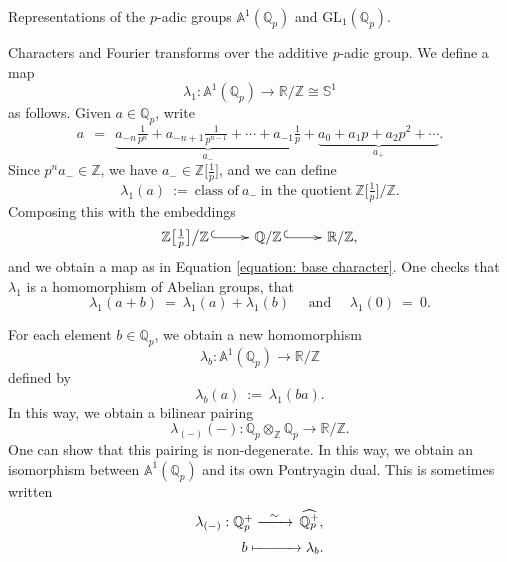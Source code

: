 \documentclass[letterpaper,11pt, reqno]{amsart}
\makeatletter
\newtheorem{monodromy theorem}{Monodromy Theorem}[subsection]
\newtheorem{wild conjecture}[theorem]{Wild Conjecture}
\newtheorem{research objectives}{Research objectives}[subsection]
\newtheorem{research question}[theorem]{Research questions}
\newtheorem{aside question}[theorem]{Aside question}
\newtheorem{audio example}[theorem]{\loudspeaker[3] Example}
\newtheorem{blank remark}[theorem]{}
\newtheorem{terminology and comment}[theorem]{Terminology and comment}
\newtheorem{purity hypothesis}[theorem]{Purity hypothesis}
\newtheorem{corollary of the purity hypothesis}[theorem]{Corollary of the purity hypothesis}
\newcommand{\QQ} {{\mathbb Q}}
\newcommand{\RR} {{\mathbb R}}
\newcommand{\ZZ} {{\mathbb Z}}
\newcommand{\lra}{{\longrightarrow}}
\newcommand{\mono}{\!\xymatrix{{}\ar@{^{(}->}[r]&{}}\!}
\numberwithin{equation}{theorem}
\makeatother
\begin{document}
\begin{section}{Representations of the $p$-adic groups $\mathbb{A}^{\!1}(\mathbb{Q}_{p})$ and $\text{GL}_{1}(\mathbb{Q}_{p})$.}
\begin{subsection}{Characters and Fourier transforms over the additive {\em p}-adic group.}
We define a map
	\begin{equation}\label{equation: base character}
	\lambda_{1}:\mathbb{A}^{\!1}(\QQ_p)\lra\RR/\ZZ\cong\mathbb{S}^{1}
	\end{equation}
as follows. Given $a\in\QQ_p$, write
	$$
	a
	\ \ =\ \ 
	\underset{a_{-}}{
	\underbrace{a_{-n}\tfrac{1}{p^n}+a_{-n+1}\tfrac{1}{p^{n-1}}+\cdots+a_{-1}\tfrac{1}{p}}}
	+
	\underset{a_{+}}{
	\underbrace{
	a_0+a_1 p+a_2 p^2+\cdots
	}}.
	$$
Since $p^{n}a_{-}\in\ZZ$, we have $a_{-}\in\ZZ\big[\tfrac{1}{p}\big]$, and we can define
	$$
	\lambda_{1}(a)
	\ :=\ 
	\text{class of}\ a_{-}\ \text{in the quotient}\ \ZZ\big[\tfrac{1}{p}\big]\big/\ZZ.
	$$
Composing this with the embeddings
	$$
	\ZZ\big[\tfrac{1}{p}\big]\big/\ZZ
	\mono
	\QQ/\ZZ
	\mono
	\RR/\ZZ,
	$$
and we obtain a map as in Equation \eqref{equation: base character}. One checks that $\lambda_1$ is a homomorphism of Abelian groups, that
	$$
	\lambda_{1}(a+b)
	\ =\ 
	\lambda_{1}(a)+\lambda_{1}(b)
	\ \ \ \ \ \ \text{and}\ \ \ \ \ \ 
	\lambda_{1}(0)
	\ =\ 
	0.
	$$

	For each element $b\in\QQ_{p}$, we obtain a new homomorphism
	$$
	\lambda_{b}:\mathbb{A}^{\!1}(\QQ_{p})\lra\RR/\ZZ
	$$
defined by
	$$
	\lambda_{b}(a)\ :=\ \lambda_{1}(ba).
	$$
In this way, we obtain a bilinear pairing
	$$
	\lambda_{(-)}(-):
	\QQ_{p}\otimes_{\ZZ}\QQ_{p}\lra\RR/\ZZ.
	$$
One can show that this pairing is non-degenerate. In this way, we obtain an isomorphism between $\mathbb{A}^{\!1}(\QQ_{p})$ and its own Pontryagin dual. This is sometimes written
	$$
	\begin{array}{c}
	\lambda_{(-)}:\QQ^{+}_{p}\xrightarrow{\ \ \sim\ \ }\ \!\widehat{\QQ^{+}_{p}},
	\\[6pt]
	\ \ \ \ \ \ \ \ \ \ b\xmapsto{\ \ \ \ \ \ \ \ \ } \lambda_{b}.
	\end{array}
	$$
	

\end{subsection}
\end{section}
\end{document}

